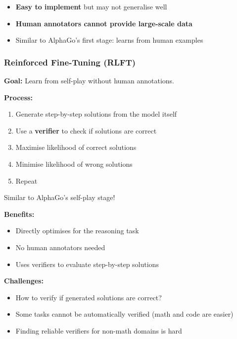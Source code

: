\begin{tipbox}
\begin{itemize}
  \item \textbf{Easy to implement} but may not generalise well
  \item \textbf{Human annotators cannot provide large-scale data}
  \item Similar to AlphaGo's first stage: learns from human examples
\end{itemize}
\end{tipbox}

\bigseparator

\subsubsection{Reinforced Fine-Tuning (RLFT)}

\begin{defbox}
\textbf{Goal:} Learn from self-play without human annotations.

\textbf{Process:}
\begin{enumerate}
  \item Generate step-by-step solutions from the model itself
  \item Use a \textbf{verifier} to check if solutions are correct
  \item Maximise likelihood of correct solutions
  \item Minimise likelihood of wrong solutions
  \item Repeat
\end{enumerate}

Similar to AlphaGo's self-play stage!
\end{defbox}

\begin{thmbox}
\textbf{Benefits:}
\begin{itemize}
  \item Directly optimises for the reasoning task
  \item No human annotators needed
  \item Uses verifiers to evaluate step-by-step solutions
\end{itemize}

\textbf{Challenges:}
\begin{itemize}
  \item How to verify if generated solutions are correct?
  \item Some tasks cannot be automatically verified (math and code are easier)
  \item Finding reliable verifiers for non-math domains is hard
\end{itemize}
\end{thmbox}

